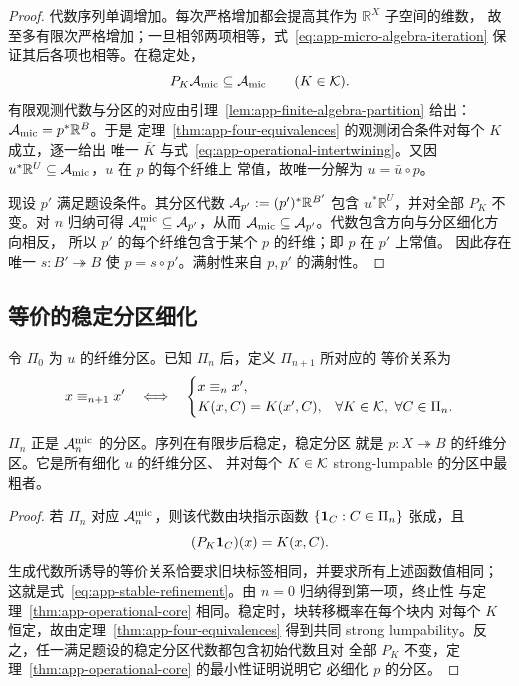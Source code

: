 \begin{proof}
代数序列单调增加。每次严格增加都会提高其作为 $\mathbb R^X$ 子空间的维数，
故至多有限次严格增加；一旦相邻两项相等，式~\eqref{eq:app-micro-algebra-iteration}
保证其后各项也相等。在稳定处，
\[
  P_K\mathcal A_{\mathrm{mic}}\subseteq\mathcal A_{\mathrm{mic}}
  \qquad(K\in\mathcal K).
\]
有限观测代数与分区的对应由引理~\ref{lem:app-finite-algebra-partition} 给出：
$\mathcal A_{\mathrm{mic}}=p^*\mathbb R^B$。于是
定理~\ref{thm:app-four-equivalences} 的观测闭合条件对每个 $K$ 成立，逐一给出
唯一 $\bar K$ 与式~\eqref{eq:app-operational-intertwining}。又因
$u^*\mathbb R^U\subseteq\mathcal A_{\mathrm{mic}}$，$u$ 在 $p$ 的每个纤维上
常值，故唯一分解为 $u=\bar u\circ p$。

现设 $p'$ 满足题设条件。其分区代数
$\mathcal A_{p'}:=(p')^*\mathbb R^{B'}$ 包含 $u^*\mathbb R^U$，并对全部
$P_K$ 不变。对 $n$ 归纳可得
$\mathcal A^{\mathrm{mic}}_n\subseteq\mathcal A_{p'}$，从而
$\mathcal A_{\mathrm{mic}}\subseteq\mathcal A_{p'}$。代数包含方向与分区细化方向相反，
所以 $p'$ 的每个纤维包含于某个 $p$ 的纤维；即 $p$ 在 $p'$ 上常值。
因此存在唯一 $s:B'\twoheadrightarrow B$ 使 $p=s\circ p'$。满射性来自
$p,p'$ 的满射性。
\end{proof}

\subsection{等价的稳定分区细化}

令 $\Pi_0$ 为 $u$ 的纤维分区。已知 $\Pi_n$ 后，定义 $\Pi_{n+1}$ 所对应的
等价关系为
\begin{equation}
 x\equiv_{n+1}x'
 \quad\Longleftrightarrow\quad
 \begin{cases}
   x\equiv_nx',\\
   K(x,C)=K(x',C),&
   \forall K\in\mathcal K,\ \forall C\in\Pi_n.
 \end{cases}
 \label{eq:app-stable-refinement}
\end{equation}

\begin{proposition}[稳定分区算法]
\label{prop:app-stable-refinement}
$\Pi_n$ 正是 $\mathcal A_n^{\mathrm{mic}}$ 的分区。序列在有限步后稳定，稳定分区
就是 $p:X\twoheadrightarrow B$ 的纤维分区。它是所有细化 $u$ 的纤维分区、
并对每个 $K\in\mathcal K$ strong-lumpable 的分区中最粗者。
\end{proposition}

\begin{proof}
若 $\Pi_n$ 对应 $\mathcal A_n^{\mathrm{mic}}$，则该代数由块指示函数
$\{\mathbf 1_C:C\in\Pi_n\}$ 张成，且
\[
  (P_K\mathbf 1_C)(x)=K(x,C).
\]
生成代数所诱导的等价关系恰要求旧块标签相同，并要求所有上述函数值相同；
这就是式~\eqref{eq:app-stable-refinement}。由 $n=0$ 归纳得到第一项，终止性
与定理~\ref{thm:app-operational-core} 相同。稳定时，块转移概率在每个块内
对每个 $K$ 恒定，故由定理~\ref{thm:app-four-equivalences} 得到共同
strong lumpability。反之，任一满足题设的稳定分区代数都包含初始代数且对
全部 $P_K$ 不变，定理~\ref{thm:app-operational-core} 的最小性证明说明它
必细化 $p$ 的分区。
\end{proof}

